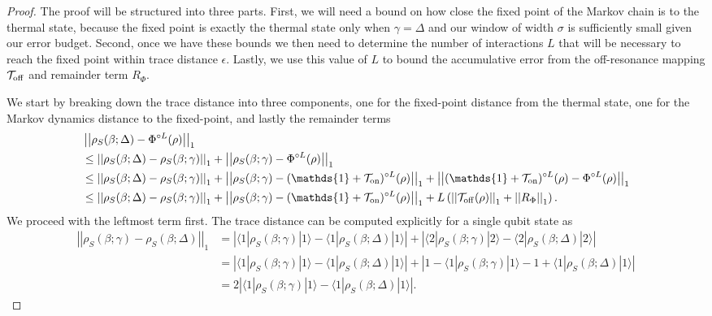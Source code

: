 \documentclass{article}
\newcommand{\on}{\rm on}
\newcommand{\off}{\rm off}
\newcommand{\ket}[1]{|#1\rangle}
\newcommand{\bra}[1]{\langle #1|}
\newcommand{\abs}[1]{\left| #1 \right|}
\newcommand{\norm}[1]{\left|\left| #1 \right|\right|}
\newcommand{\identity}{\mathds{1}}
\begin{document}
\begin{proof}
    The proof will be structured into three parts. First, we will need a bound on how close the fixed point of the Markov chain is to the thermal state, because  the fixed point  is exactly the thermal state only when $\gamma = \Delta$ and our window of width $\sigma$ is sufficiently small given our error budget. Second, once we have these bounds we then need to determine the number of interactions $L$ that will be necessary to reach the fixed point within trace distance $\epsilon$. Lastly, we use this value of $L$ to bound the accumulative error from the off-resonance mapping $\mathcal{T}_{\off}$ and remainder term $R_{\Phi}$.

    We start by breaking down the trace distance into three components, one for the fixed-point distance from the thermal state, one for the Markov dynamics distance to the fixed-point, and lastly the remainder terms
    \begin{align}
        &\norm{\rho_S(\beta; \Delta) - \Phi^{\circ L}(\rho)}_1 \nonumber \\
        &\le \norm{\rho_S(\beta; \Delta) - \rho_S(\beta; \gamma)}_1 + \norm{\rho_S(\beta; \gamma) - \Phi^{\circ L}(\rho)}_1 \\
        &\le \norm{\rho_S(\beta; \Delta) - \rho_S(\beta; \gamma)}_1 + \norm{\rho_S(\beta; \gamma) - (\identity + \mathcal{T}_{\on})^{\circ L}(\rho)}_1 + \norm{(\identity + \mathcal{T}_{\on})^{\circ L}(\rho) - \Phi^{\circ L}(\rho)}_1 \\
        &\le \norm{\rho_S(\beta; \Delta) - \rho_S(\beta; \gamma)}_1 + \norm{\rho_S(\beta; \gamma) - (\identity + \mathcal{T}_{\on})^{\circ L}(\rho)}_1 +  L \left(\norm{\mathcal{T}_{\off}(\rho)}_1 + \norm{R_{\Phi}}_1 \right). \label{eq:single_qubit_three_errors}
    \end{align}
    We proceed with the leftmost term first. The trace distance can be computed explicitly for a single qubit state as 
 \begin{align}
     \norm{\rho_S(\beta; \gamma) - \rho_S(\beta; \Delta)}_1 &= \abs{\bra{1} \rho_S(\beta; \gamma) \ket{1} - \bra{1}\rho_S(\beta;\Delta)\ket{1}} + \abs{\bra{2} \rho_S(\beta; \gamma) \ket{2} - \bra{2}\rho_S(\beta; \Delta)\ket{2}} \\
     &= \abs{\bra{1} \rho_S(\beta; \gamma) \ket{1} - \bra{1}\rho_S(\beta; \Delta)\ket{1}} + \abs{1 - \bra{1} \rho_S(\beta; \gamma) \ket{1} -1 + \bra{1}\rho_S(\beta; \Delta)\ket{1}} \\
     &= 2 \abs{\bra{1} \rho_S(\beta; \gamma) \ket{1} - \bra{1}\rho_S(\beta; \Delta)\ket{1}}. \label{eq:single_qubit_int_1}

\end{align}
\end{proof}
\end{document}
